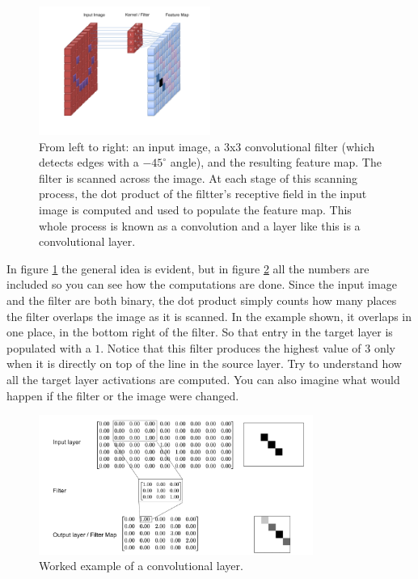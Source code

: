 \begin{figure}[h]
\centering
\includegraphics[width=0.5\textwidth]{images/CNN_Filter.png}
\caption[User Cecbur, \url{https://commons.wikimedia.org/wiki/File:Convolutional_Neural_Network_NeuralNetworkFilter.gif}, with labels added by Jeff Yoshimi.]{From left to right: an input image, a 3x3 convolutional filter (which detects edges with a $-45^\circ$ angle), and the resulting feature map. The filter is scanned across the image. At each stage of this scanning process, the dot product of the filtter's receptive field in the input image is computed and used to populate the feature map. This whole process is known as a convolution and a layer like this is a convolutional layer.}
\label{cnn_filter}
\end{figure}

In figure \ref{cnn_filter} the general idea is evident, but in figure \ref{cnn_workedExample} all the numbers are included so you can see how the computations are done. Since the input image and the filter are both binary, the dot product simply counts how many places the filter overlaps the image as it is scanned. In the example shown, it overlaps in one place, in the bottom right of the filter.  So that entry in the target layer is populated with a $1$.  Notice that this filter produces the highest value of $3$ only when it is directly on top of the line in the source layer. Try to understand how all the target layer activations are computed. You can also imagine what would happen if the filter or the image were changed.

\begin{figure}[h]
\centering
\includegraphics[width=0.8\textwidth]{images/CNN_WorkedExample.png}
\caption[Jeff Yoshimi]{Worked example of a convolutional layer.}
\label{cnn_workedExample}
\end{figure}

